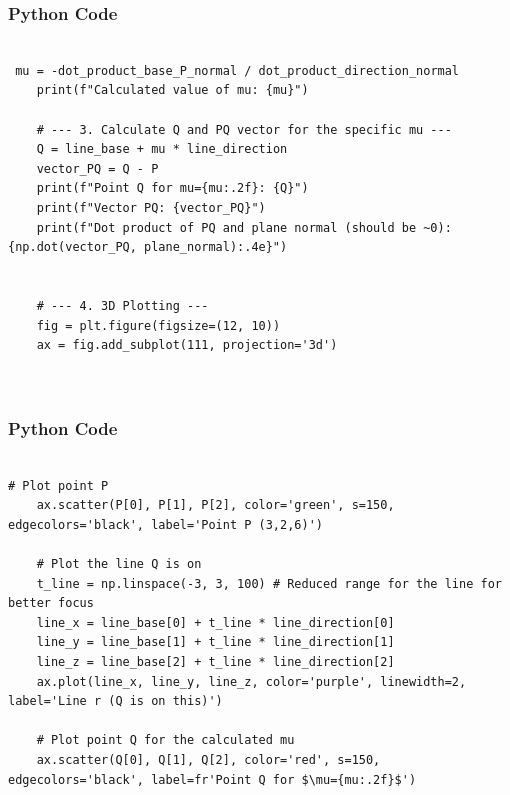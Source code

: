 \documentclass{beamer}
\begin{document}
\begin{frame}[fragile]
    \frametitle{Python Code}
    \begin{lstlisting}

 mu = -dot_product_base_P_normal / dot_product_direction_normal
    print(f"Calculated value of mu: {mu}")

    # --- 3. Calculate Q and PQ vector for the specific mu ---
    Q = line_base + mu * line_direction
    vector_PQ = Q - P
    print(f"Point Q for mu={mu:.2f}: {Q}")
    print(f"Vector PQ: {vector_PQ}")
    print(f"Dot product of PQ and plane normal (should be ~0): {np.dot(vector_PQ, plane_normal):.4e}")


    # --- 4. 3D Plotting ---
    fig = plt.figure(figsize=(12, 10))
    ax = fig.add_subplot(111, projection='3d')

    

    \end{lstlisting}
\end{frame}


\begin{frame}[fragile]
    \frametitle{Python Code}
    \begin{lstlisting}

# Plot point P
    ax.scatter(P[0], P[1], P[2], color='green', s=150, edgecolors='black', label='Point P (3,2,6)')

    # Plot the line Q is on
    t_line = np.linspace(-3, 3, 100) # Reduced range for the line for better focus
    line_x = line_base[0] + t_line * line_direction[0]
    line_y = line_base[1] + t_line * line_direction[1]
    line_z = line_base[2] + t_line * line_direction[2]
    ax.plot(line_x, line_y, line_z, color='purple', linewidth=2, label='Line r (Q is on this)')

    # Plot point Q for the calculated mu
    ax.scatter(Q[0], Q[1], Q[2], color='red', s=150, edgecolors='black', label=fr'Point Q for $\mu={mu:.2f}$')

  

    \end{lstlisting}
\end{frame}
\end{document}
